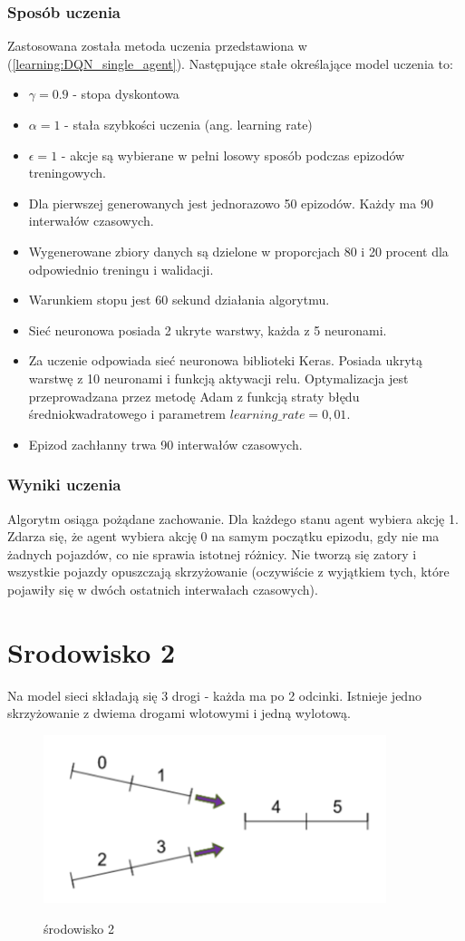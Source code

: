 \documentclass[12pt]{book}
\theoremstyle{plain}
\newcommand{\myref}[1]{(\ref{#1})}
\begin{document}
\subsubsection*{Sposób uczenia}
Zastosowana została metoda uczenia przedstawiona w \myref{learning:DQN_single_agent}. Następujące stałe określające model uczenia to:
\begin{itemize}
	\item $\gamma = 0.9$ - stopa dyskontowa
	\item $\alpha = 1$ - stała szybkości uczenia (ang. learning rate)
	\item $\epsilon = 1$ - akcje są wybierane w pełni losowy sposób podczas epizodów treningowych.
	\item Dla pierwszej generowanych jest jednorazowo 50 epizodów. Każdy ma 90 interwałów czasowych.
	\item Wygenerowane zbiory danych są dzielone w proporcjach 80 i 20 procent dla odpowiednio treningu i walidacji.
	\item Warunkiem stopu jest 60 sekund działania algorytmu.
	\item Sieć neuronowa posiada 2 ukryte warstwy, każda z 5 neuronami.
	\item Za uczenie odpowiada sieć neuronowa biblioteki Keras. Posiada ukrytą warstwę z 10 neuronami i funkcją aktywacji relu. Optymalizacja jest przeprowadzana przez metodę Adam z funkcją straty błędu średniokwadratowego i parametrem $learning\_rate = 0,01$. 
	\item Epizod zachłanny trwa 90 interwałów czasowych.
\end{itemize}

\subsubsection{Wyniki uczenia}
Algorytm osiąga pożądane zachowanie. Dla każdego stanu agent wybiera akcję 1. Zdarza się, że agent wybiera akcję 0 na samym początku epizodu, gdy nie ma żadnych pojazdów, co nie sprawia istotnej różnicy. Nie tworzą się zatory i wszystkie pojazdy opuszczają skrzyżowanie (oczywiście z wyjątkiem tych, które pojawiły się w dwóch ostatnich interwałach czasowych).

\section{Srodowisko 2}
Na model sieci składają się 3 drogi - każda ma po 2 odcinki. Istnieje jedno skrzyżowanie z dwiema drogami wlotowymi i jedną wylotową.
	\begin{figure}[H]
	\centering
	\includegraphics[width=10cm]{images/env_14}
	\label{fig:env_14}
	\caption{środowisko 2}
\end{figure}
\end{document}
